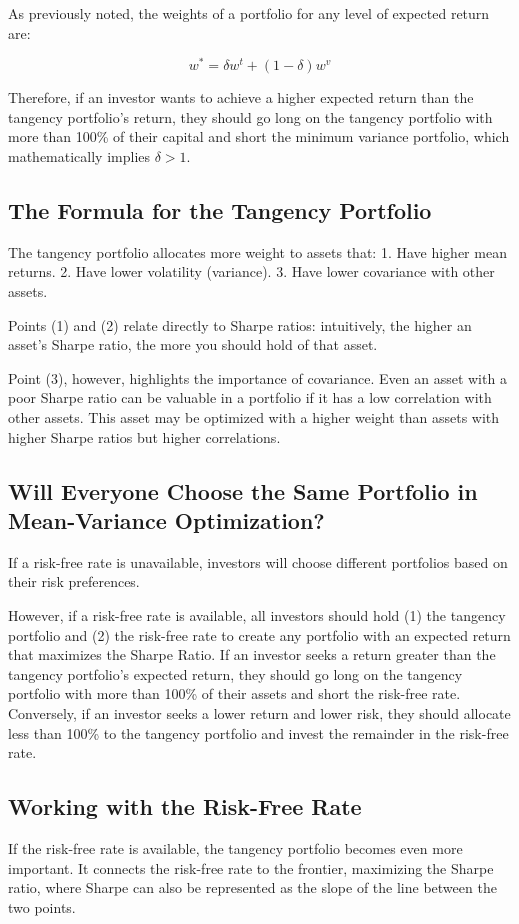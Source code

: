 \documentclass{article}
\begin{document}
As previously noted, the weights of a portfolio for any level of expected return are:

$$
w^{*}={\delta}{w}^{t}+(1-{\delta}){w}^{v}
$$

Therefore, if an investor wants to achieve a higher expected return than the tangency portfolio's return, they should go long on the tangency portfolio with more than 100\% of their capital and short the minimum variance portfolio, which mathematically implies ${\delta}>1$.

\subsection{The Formula for the Tangency Portfolio}
The tangency portfolio allocates more weight to assets that:
1. Have higher mean returns.
2. Have lower volatility (variance).
3. Have lower covariance with other assets.

Points (1) and (2) relate directly to Sharpe ratios: intuitively, the higher an asset's Sharpe ratio, the more you should hold of that asset.

Point (3), however, highlights the importance of covariance. Even an asset with a poor Sharpe ratio can be valuable in a portfolio if it has a low correlation with other assets. This asset may be optimized with a higher weight than assets with higher Sharpe ratios but higher correlations.

\subsection{Will Everyone Choose the Same Portfolio in Mean-Variance Optimization?}
If a risk-free rate is unavailable, investors will choose different portfolios based on their risk preferences.

However, if a risk-free rate is available, all investors should hold (1) the tangency portfolio and (2) the risk-free rate to create any portfolio with an expected return that maximizes the Sharpe Ratio. If an investor seeks a return greater than the tangency portfolio's expected return, they should go long on the tangency portfolio with more than 100\% of their assets and short the risk-free rate. Conversely, if an investor seeks a lower return and lower risk, they should allocate less than 100\% to the tangency portfolio and invest the remainder in the risk-free rate.

\subsection{Working with the Risk-Free Rate}
If the risk-free rate is available, the tangency portfolio becomes even more important. It connects the risk-free rate to the frontier, maximizing the Sharpe ratio, where Sharpe can also be represented as the slope of the line between the two points.
\end{document}
